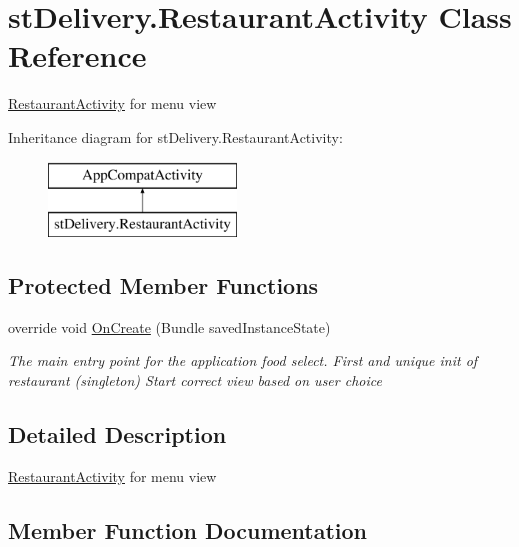 \hypertarget{classst_delivery_1_1_restaurant_activity}{}\section{st\+Delivery.\+Restaurant\+Activity Class Reference}
\label{classst_delivery_1_1_restaurant_activity}


\hyperlink{classst_delivery_1_1_restaurant_activity}{Restaurant\+Activity} for menu view  


Inheritance diagram for st\+Delivery.\+Restaurant\+Activity\+:\begin{figure}[H]
\begin{center}
\leavevmode
\includegraphics[height=2.000000cm]{classst_delivery_1_1_restaurant_activity}
\end{center}
\end{figure}
\subsection*{Protected Member Functions}
\begin{DoxyCompactItemize}
\item 
override void \hyperlink{classst_delivery_1_1_restaurant_activity_ae376f35ea4aebdfdc3823dcb20bdbb95}{On\+Create} (Bundle saved\+Instance\+State)
\begin{DoxyCompactList}\small\item\em The main entry point for the application food select. First and unique init of restaurant (singleton) Start correct view based on user choice \end{DoxyCompactList}\end{DoxyCompactItemize}


\subsection{Detailed Description}
\hyperlink{classst_delivery_1_1_restaurant_activity}{Restaurant\+Activity} for menu view 



\subsection{Member Function Documentation}
\mbox{\label{classst_delivery_1_1_restaurant_activity_ae376f35ea4aebdfdc3823dcb20bdbb95}} 
